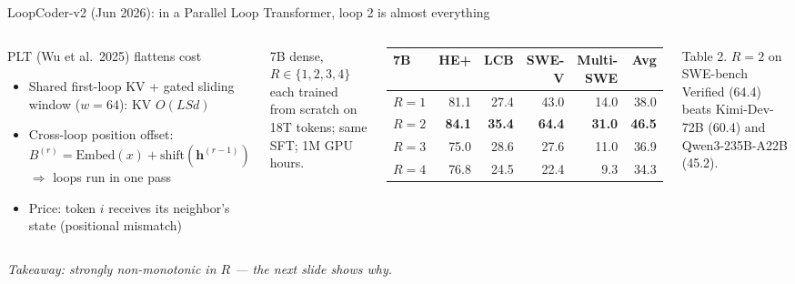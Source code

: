 \documentclass[aspectratio=169,10pt]{beamer}
\newcommand{\con}[1]{\textcolor{negative}{#1}}
\begin{document}
\begin{frame}{LoopCoder-v2 (Jun 2026): in a Parallel Loop Transformer, loop 2 is almost everything}
  \begin{columns}[T]
      \begin{block}{PLT (Wu et al.\ 2025) flattens cost}
        \begin{itemize}
          \item Shared first-loop KV + gated sliding window ($w{=}64$): KV $O(LSd)$
          \item Cross-loop position offset: $B^{(r)} = \mathrm{Embed}(x) + \mathrm{shift}(\mathbf{h}^{(r-1)})$ $\Rightarrow$ loops run in one pass
          \item \con{Price}: token $i$ receives its neighbor's state (positional mismatch)
        \end{itemize}
      \end{block}
      7B dense, $R \in \{1,2,3,4\}$ each trained from scratch on 18T tokens; same SFT; 1M GPU hours.
      \vspace{4pt}
      \begin{center}
      \small
      \begin{tabular}{@{}lrrrrr@{}}
        \toprule
        7B & HE+ & LCB & SWE-V & Multi-SWE & Avg \\
        \midrule
        $R{=}1$ & 81.1 & 27.4 & 43.0 & 14.0 & 38.0 \\
        \rowcolor{positive!12} $R{=}2$ & \textbf{84.1} & \textbf{35.4} & \textbf{64.4} & \textbf{31.0} & \textbf{46.5} \\
        $R{=}3$ & 75.0 & 28.6 & 27.6 & 11.0 & 36.9 \\
        $R{=}4$ & 76.8 & 24.5 & 22.4 & 9.3 & 34.3 \\
        \bottomrule
      \end{tabular}
      \end{center}
      {\small Table 2. $R{=}2$ on SWE-bench Verified (64.4) beats Kimi-Dev-72B (60.4) and Qwen3-235B-A22B (45.2).}
  \end{columns}
  \vspace{4pt}
  \textit{Takeaway: strongly non-monotonic in $R$ --- the next slide shows why.}
\end{frame}
\end{document}
